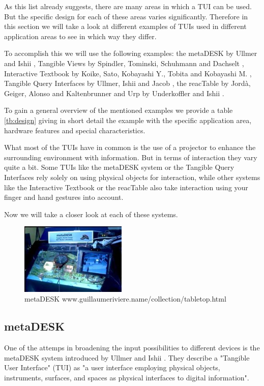 As this list already suggests, there are many areas in which a TUI can be used. But the specific design for each of these areas varies significantly. Therefore in this section we will take a look at different examples of TUIs used in different application areas to see in which way they differ. 

To accomplish this we will use the following examples: the metaDESK by Ullmer and Ishii \cite{ullmer97}, Tangible Views by Spindler, Tominski, Schuhmann and Dachselt \cite{spindler10}, Interactive Textbook by Koike, Sato, Kobayashi Y., Tobita and Kobayashi M. \cite{koike00}, Tangible Query Interfaces by Ullmer, Ishii and Jacob \cite{ullmer03}, the reacTable by Jord\`{a}, Geiger, Alonso and Kaltenbrunner \cite{jorda07} and Urp by Underkoffler and Ishii \cite{underkoffler99}. 

To gain a general overview of the mentioned examples we provide a table \ref{tb:design} giving in short detail the example with the specific application area, hardware features and special characteristics. 

What most of the TUIs have in common is the use of a projector to enhance the surrounding environment with information. But in terms of interaction they vary quite a bit. Some TUIs like the metaDESK system or the Tangible Query Interfaces rely solely on using physical objects for interaction, while other systems like the Interactive Textbook or the reacTable also take interaction using your finger and hand gestures into account.  

Now we will take a closer look at each of these systems. 






\begin{figure}
\centering
\includegraphics[width=0.45\textwidth]{figures/metaDesk.jpg}
\caption{metaDESK www.guillaumeriviere.name/collection/tabletop.html}
\label{fig:metadesk}
\end{figure}

\subsection{metaDESK}
One of the attemps in broadening the input possibilities to different devices is the metaDESK system introduced by Ullmer and Ishii \cite{ullmer97}. They describe a "Tangible User Interface" (TUI) as "a user interface employing physical objects, instruments, surfaces, and spaces as physical interfaces to digital information". 


